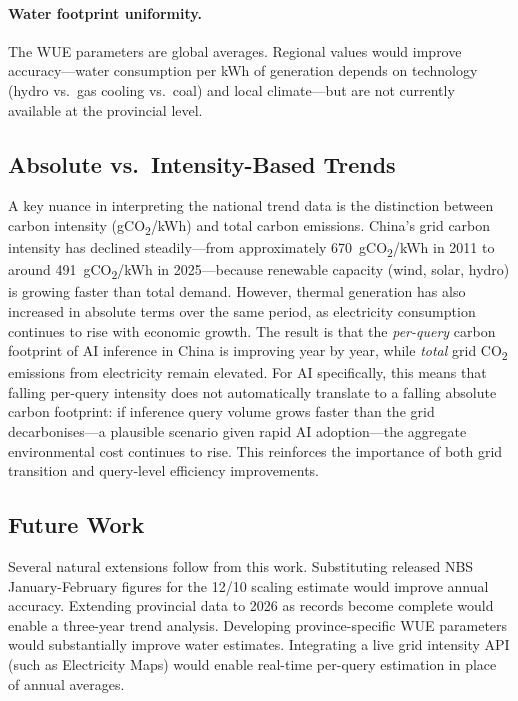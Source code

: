 \documentclass[11pt,a4paper]{article}
\begin{document}
\paragraph{Water footprint uniformity.}
The WUE parameters are global averages. Regional values would improve
accuracy---water consumption per kWh of generation depends on technology
(hydro vs.\ gas cooling vs.\ coal) and local climate---but are not currently
available at the provincial level.

\subsection{Absolute vs.\ Intensity-Based Trends}

A key nuance in interpreting the national trend data is the distinction
between carbon intensity (gCO\textsubscript{2}/kWh) and total carbon
emissions. China's grid carbon intensity has declined steadily---from
approximately 670~gCO\textsubscript{2}/kWh in 2011 to around
491~gCO\textsubscript{2}/kWh in 2025---because renewable capacity (wind,
solar, hydro) is growing faster than total demand. However, thermal
generation has also increased in absolute terms over the same period, as
electricity consumption continues to rise with economic growth. The result
is that the \emph{per-query} carbon footprint of AI inference in China is
improving year by year, while \emph{total} grid CO\textsubscript{2}
emissions from electricity remain elevated. For AI specifically, this
means that falling per-query intensity does not automatically translate
to a falling absolute carbon footprint: if inference query volume grows
faster than the grid decarbonises---a plausible scenario given rapid AI
adoption---the aggregate environmental cost continues to rise. This
reinforces the importance of both grid transition and query-level
efficiency improvements.

\subsection{Future Work}

Several natural extensions follow from this work. Substituting released NBS
January-February figures for the 12/10 scaling estimate would improve
annual accuracy. Extending provincial data to 2026 as records become
complete would enable a three-year trend analysis. Developing
province-specific WUE parameters would substantially improve water
estimates. Integrating a live grid intensity API (such as Electricity Maps)
would enable real-time per-query estimation in place of annual averages.
\end{document}
